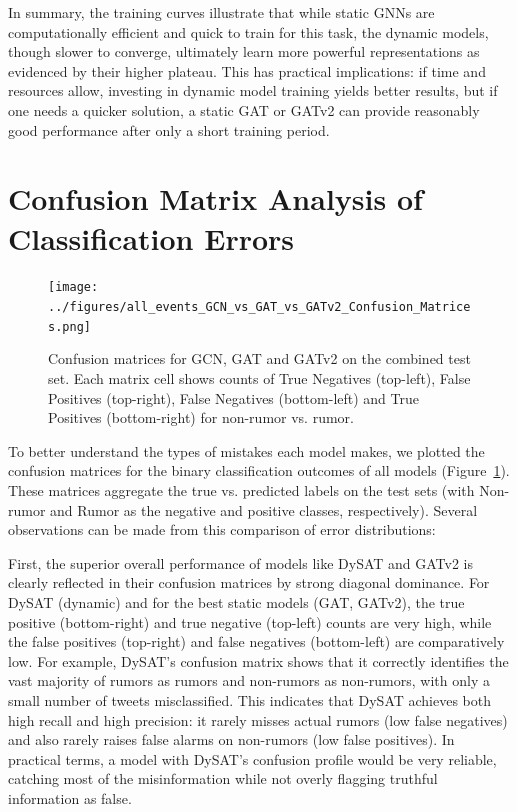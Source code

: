 \documentclass{cshonours}
\begin{document}
In summary, the training curves illustrate that while static GNNs are computationally efficient and quick to train for this task, the dynamic models, though slower to converge, ultimately learn more powerful representations as evidenced by their higher plateau. This has practical implications: if time and resources allow, investing in dynamic model training yields better results, but if one needs a quicker solution, a static GAT or GATv2 can provide reasonably good performance after only a short training period.



\section{Confusion Matrix Analysis of Classification Errors}



\begin{figure}

\centering

\texttt{[image: ../figures/all\_events\_GCN\_vs\_GAT\_vs\_GATv2\_Confusion\_Matrices.png]}

\caption[Test-set confusion matrices]{Confusion matrices for GCN, GAT and GATv2 on the combined test set. Each matrix cell shows counts of True Negatives (top-left), False Positives (top-right), False Negatives (bottom-left) and True Positives (bottom-right) for non-rumor vs. rumor.}

\label{fig:conf_matrices}

\end{figure}



To better understand the types of mistakes each model makes, we plotted the confusion matrices for the binary classification outcomes of all models (Figure~\ref{fig:conf_matrices}). These matrices aggregate the true vs. predicted labels on the test sets (with Non-rumor and Rumor as the negative and positive classes, respectively). Several observations can be made from this comparison of error distributions:



First, the superior overall performance of models like DySAT and GATv2 is clearly reflected in their confusion matrices by strong diagonal dominance. For DySAT (dynamic) and for the best static models (GAT, GATv2), the true positive (bottom-right) and true negative (top-left) counts are very high, while the false positives (top-right) and false negatives (bottom-left) are comparatively low. For example, DySAT's confusion matrix shows that it correctly identifies the vast majority of rumors as rumors and non-rumors as non-rumors, with only a small number of tweets misclassified. This indicates that DySAT achieves both high recall and high precision: it rarely misses actual rumors (low false negatives) and also rarely raises false alarms on non-rumors (low false positives). In practical terms, a model with DySAT's confusion profile would be very reliable, catching most of the misinformation while not overly flagging truthful information as false.
\end{document}
